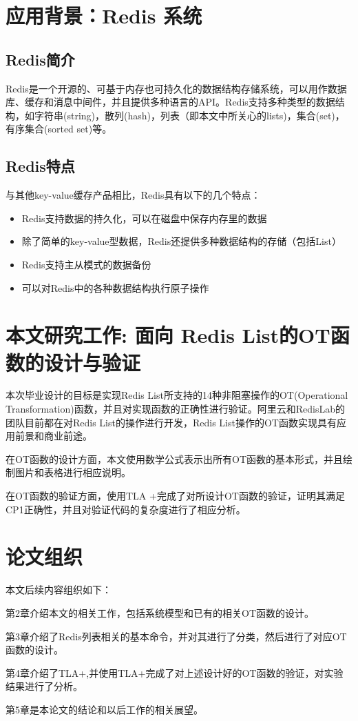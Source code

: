 \section{应用背景：Redis 系统}
\subsection{Redis简介}
Redis是一个开源的、可基于内存也可持久化的数据结构存储系统，可以用作数据库、缓存和消息中间件，并且提供多种语言的API。Redis支持多种类型的数据结构，如字符串(string)，散列(hash)，列表（即本文中所关心的lists)，集合(set)，有序集合(sorted set)等。
\subsection{Redis特点}
与其他key-value缓存产品相比，Redis具有以下的几个特点：
\begin{itemize}
\item Redis支持数据的持久化，可以在磁盘中保存内存里的数据
\item 除了简单的key-value型数据，Redis还提供多种数据结构的存储（包括List）
\item Redis支持主从模式的数据备份
\item 可以对Redis中的各种数据结构执行原子操作
\end{itemize}
\section{本文研究工作: 面向 Redis List的OT函数的设计与验证}
	\par 本次毕业设计的目标是实现Redis List所支持的14种非阻塞操作的OT(Operational Transformation)函数，并且对实现函数的正确性进行验证。阿里云和RedisLab的团队目前都在对Redis List的操作进行开发，Redis List操作的OT函数实现具有应用前景和商业前途。

	\par 在OT函数的设计方面，本文使用数学公式表示出所有OT函数的基本形式，并且绘制图片和表格进行相应说明。

	\par 在OT函数的验证方面，使用TLA +完成了对所设计OT函数的验证，证明其满足CP1正确性，并且对验证代码的复杂度进行了相应分析。
\section{论文组织}
	\par 本文后续内容组织如下：
	\par 第2章介绍本文的相关工作，包括系统模型和已有的相关OT函数的设计。
	\par 第3章介绍了Redis列表相关的基本命令，并对其进行了分类，然后进行了对应OT函数的设计。
	\par 第4章介绍了TLA+,并使用TLA+完成了对上述设计好的OT函数的验证，对实验结果进行了分析。
	\par 第5章是本论文的结论和以后工作的相关展望。